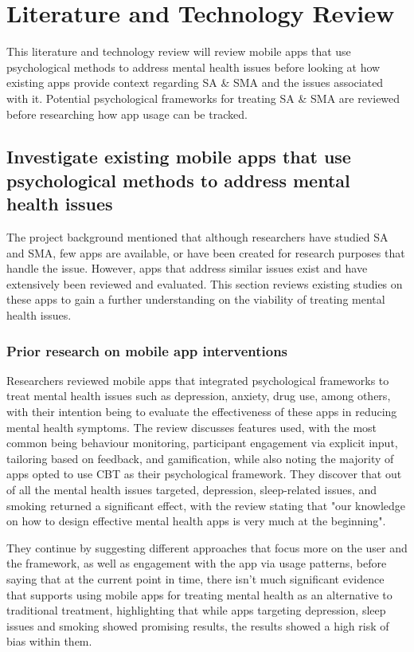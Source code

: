 \documentclass[12pt]{article}
\begin{document}
\newpage



\section{Literature and Technology Review}
This literature and technology review will review mobile apps that use psychological methods to address mental 
health issues before looking at how existing apps provide context regarding SA \& SMA and
the issues associated with it. Potential psychological frameworks for treating SA \& SMA are reviewed 
before researching how app usage can be tracked.

\subsection{Investigate existing mobile apps that use psychological methods to address mental health issues}
The project background mentioned that although researchers have studied SA and SMA, few apps are available, 
or have been created for research purposes that handle the issue. However, apps that address similar 
issues exist and have extensively been reviewed and evaluated. This section reviews existing
studies on these apps to gain a further understanding on the viability of treating mental health issues.

\subsubsection{Prior research on mobile app interventions}
Researchers  reviewed mobile apps that integrated
psychological frameworks to treat mental health issues such as depression, anxiety,
drug use, among others, with their intention being to evaluate the 
effectiveness of these apps in reducing mental health symptoms. The review discusses features used, 
with the most common being behaviour monitoring, participant engagement via explicit input, tailoring based on 
feedback, 
and gamification, while also noting the majority of apps opted to use CBT as their psychological framework.
They discover that out of all the mental health issues targeted, depression, sleep-related 
issues, and smoking returned a significant effect, with the review stating that "our knowledge on how to design 
effective mental health apps is very much at the beginning". \newline

They continue by suggesting different approaches that focus more on the user and the framework, as well as 
engagement with the app via usage patterns,
before saying that at the current point in time, there isn't much significant evidence 
that supports using mobile apps for treating mental health as an alternative to traditional treatment, highlighting that
while apps targeting depression, sleep issues and smoking showed promising results, the results showed a high
risk of bias within them. \newline
\end{document}
